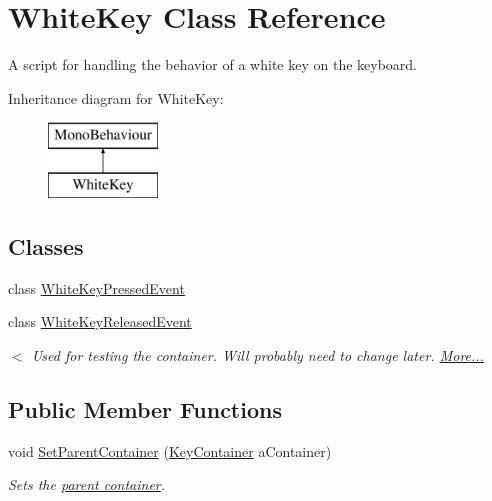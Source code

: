 \hypertarget{class_white_key}{}\section{White\+Key Class Reference}
\label{class_white_key}


A script for handling the behavior of a white key on the keyboard.  


Inheritance diagram for White\+Key\+:\begin{figure}[H]
\begin{center}
\leavevmode
\includegraphics[height=2.000000cm]{class_white_key}
\end{center}
\end{figure}
\subsection*{Classes}
\begin{DoxyCompactItemize}
\item 
class \hyperlink{group___white_key_event_types_class_white_key_1_1_white_key_pressed_event}{White\+Key\+Pressed\+Event}
\item 
class \hyperlink{group___white_key_event_types_class_white_key_1_1_white_key_released_event}{White\+Key\+Released\+Event}
\begin{DoxyCompactList}\small\item\em $<$ Used for testing the container. Will probably need to change later.  \hyperlink{group___white_key_event_types_class_white_key_1_1_white_key_released_event}{More...}\end{DoxyCompactList}\end{DoxyCompactItemize}
\subsection*{Public Member Functions}
\begin{DoxyCompactItemize}
\item 
void \hyperlink{group___white_key_pub_func_gab926585e88db73a20431ac93d979b61d}{Set\+Parent\+Container} (\hyperlink{class_key_container}{Key\+Container} a\+Container)
\begin{DoxyCompactList}\small\item\em Sets the \hyperlink{group___doc_key_contain}{parent container}. \end{DoxyCompactList}\end{DoxyCompactItemize}
